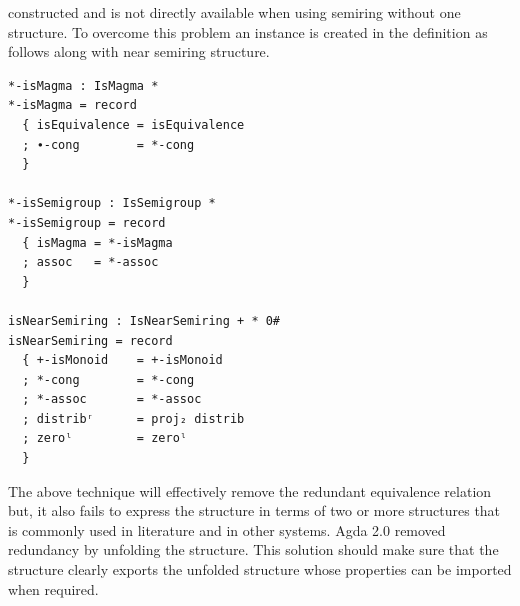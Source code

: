 constructed and is not directly available when using semiring without one
structure. To overcome this problem an instance is created in the definition as
follows along with near semiring structure. \\
\begin{verbatim}
*-isMagma : IsMagma *
*-isMagma = record
  { isEquivalence = isEquivalence
  ; ∙-cong        = *-cong
  }

*-isSemigroup : IsSemigroup *
*-isSemigroup = record
  { isMagma = *-isMagma
  ; assoc   = *-assoc
  }

isNearSemiring : IsNearSemiring + * 0#
isNearSemiring = record
  { +-isMonoid    = +-isMonoid
  ; *-cong        = *-cong
  ; *-assoc       = *-assoc
  ; distribʳ      = proj₂ distrib
  ; zeroˡ         = zeroˡ
  }
\end{verbatim}
The above technique will effectively remove the redundant equivalence relation
but, it also fails to express the structure in terms of two or more structures
that is commonly used in literature and in other systems. Agda 2.0 removed
redundancy by unfolding the structure. This solution should make sure that the
structure clearly exports the unfolded structure whose properties can be
imported when required.

